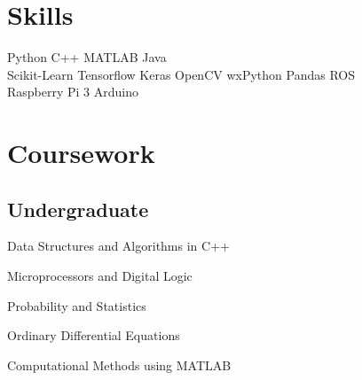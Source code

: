 \documentclass[]{deedy-resume-openfont}
\begin{document}
%
%


%
%

\begin{minipage}[t]{0.33\textwidth} 


\section{Skills}
Python \textbullet{} C++ \textbullet{} MATLAB \textbullet{} Java \\
Scikit-Learn \textbullet{} Tensorflow \textbullet{} Keras \textbullet{} OpenCV \textbullet{} wxPython \textbullet{} Pandas \textbullet{} ROS \\
Raspberry Pi 3 \textbullet{} Arduino

\sectionsep


\section{Coursework}
\subsection{Undergraduate}
\vspace{\topsep}
\begin{tightemize}
\item Data Structures and Algorithms in C++
\item Microprocessors and Digital Logic
\item Probability and Statistics
\item Ordinary Differential Equations
\item Computational Methods using MATLAB
\end{tightemize}
\sectionsep


\end{minipage}
\end{document}
